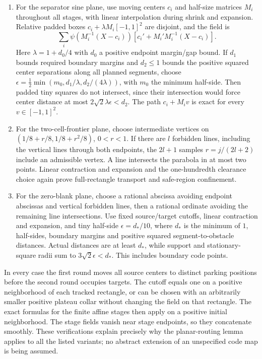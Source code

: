 \begin{enumerate}
\item For the separator sine plane, use moving centers $c_i$ and half-size matrices $M_i$ throughout all stages, with linear interpolation during shrink and expansion.  Relative padded boxes $c_i+\lambda M_i[-1,1]^2$ are disjoint, and the field is
\[
 \sum_i\psi(M_i^{-1}(X-c_i))
     [c_i'+M_i'M_i^{-1}(X-c_i)].
\]
Here $\lambda=1+d_0/4$ with $d_0$ a positive endpoint margin/gap bound.  If $d_1$ bounds required boundary margins and $d_2\le1$ bounds the positive squared center separations along all planned segments, choose
$\epsilon=\tfrac12\min(m_0,d_1/\lambda,d_2/(4\lambda))$, with $m_0$ the minimum half-side.  Then padded tiny squares do not intersect, since their intersection would force center distance at most $2\sqrt2\lambda\epsilon<d_2$.  The path $c_i+M_i v$ is exact for every $v\in[-1,1]^2$.
\item For the two-cell-frontier plane, choose intermediate vertices on
$(1/8+r/8,1/8+r^2/8)$, $0<r<1$.  If there are $l$ forbidden lines, including the vertical lines through both endpoints, the $2l+1$ samples $r=j/(2l+2)$ include an admissible vertex.  A line intersects the parabola in at most two points.  Linear contraction and expansion and the one-hundredth clearance choice again prove full-rectangle transport and safe-region confinement.
\item For the zero-blank plane, choose a rational abscissa avoiding endpoint abscissas and vertical forbidden lines, then a rational ordinate avoiding the remaining line intersections.  Use fixed source/target cutoffs, linear contraction and expansion, and tiny half-side $\epsilon=d_*/10$, where $d_*$ is the minimum of $1$, half-sides, boundary margins and positive squared segment-to-obstacle distances.  Actual distances are at least $d_*$, while support and stationary-square radii sum to $3\sqrt2\epsilon<d_*$.  This includes boundary code points.
\end{enumerate}
In every case the first round moves all source centers to distinct parking positions before the second round occupies targets.  The cutoff equals one on a positive neighborhood of each tracked rectangle, or can be chosen with an arbitrarily smaller positive plateau collar without changing the field on that rectangle.  The exact formulas for the finite affine stages then apply on a positive initial neighborhood.  The stage fields vanish near stage endpoints, so they concatenate smoothly.  These verifications explain precisely why the planar-routing lemma applies to all the listed variants; no abstract extension of an unspecified code map is being assumed.

